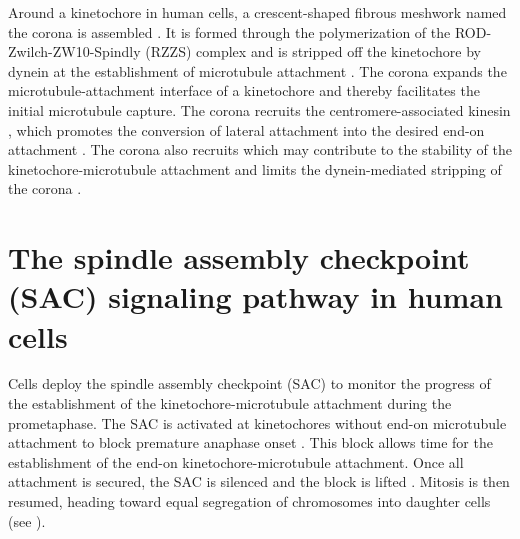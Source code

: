 
Around a kinetochore in human cells, a crescent-shaped fibrous meshwork named the corona is assembled \cite{CoronaReview_Kops+Gassman2020}. It is formed through the polymerization of the ROD-Zwilch-ZW10-Spindly (RZZS) complex \cite{RZZS_Sacristan2018, RZZS_Raisch2022} and is stripped off the kinetochore by dynein at the establishment of microtubule attachment \cite{DyneinStripsCorona}. The corona expands the microtubule-attachment interface of a kinetochore and thereby facilitates the initial microtubule capture. The corona recruits the centromere-associated kinesin , which promotes the conversion of lateral attachment into the desired end-on attachment \cite{Corona-CENP-E_Yao1997, GSK923295MonastrolCotreatment, CENPEActivity-BUBR1}. The corona also recruits  which may contribute to the stability of the kinetochore-microtubule attachment and limits the dynein-mediated stripping of the corona \cite{CENP-FLimitsStripping}.

\section{The spindle assembly checkpoint (SAC) signaling pathway in human cells}
\label{TwoSACPathwaysIntro}

Cells deploy the spindle assembly checkpoint (SAC) to monitor the progress of the establishment of the kinetochore-microtubule attachment during the prometaphase. The SAC is activated at kinetochores without end-on microtubule attachment to block premature anaphase onset \cite{GSK923295MonastrolCotreatment, GSK923295LateralAttachmentEM, LateralAttachmentSAC}. This block allows time for the establishment of the end-on kinetochore-microtubule attachment. Once all attachment is secured, the SAC is silenced and the block is lifted \cite{SACActivationAndSilencing}. Mitosis is then resumed, heading toward equal segregation of chromosomes into daughter cells (see ).

